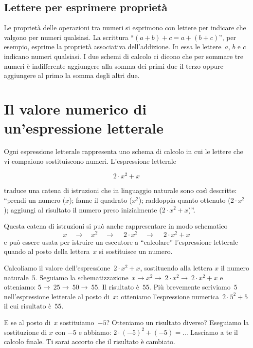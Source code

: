 \subsection{Lettere per esprimere proprietà}

Le proprietà delle operazioni tra numeri si esprimono con lettere per indicare che valgono per numeri
qualsiasi.
La scrittura ``$(a+b)+c=a+(b+c)$'', per esempio, esprime la proprietà associativa dell'addizione. In essa le lettere~$a$, $b$ e $c$ indicano
numeri qualsiasi. I due schemi di calcolo ci dicono che per sommare tre numeri è indifferente aggiungere alla somma
dei primi due il terzo oppure aggiungere al primo la somma degli altri due.

\vspazio\ovalbox{\risolvii \ref{ese:8.5}, \ref{ese:8.6}, \ref{ese:8.7}, \ref{ese:8.8}, \ref{ese:8.9}, \ref{ese:8.10}, \ref{ese:8.11}, \ref{ese:8.12}}

\section{Il valore numerico di un'espressione letterale}

Ogni espressione letterale rappresenta uno schema di calcolo in cui le lettere che vi compaiono sostituiscono numeri.
L'espressione letterale

\[2\cdot x^{2}+x\]

\noindent traduce una catena di istruzioni che in linguaggio naturale sono così
descritte: ``prendi un numero ($x$); fanne il quadrato ($x^2$); raddoppia quanto ottenuto ($2\cdot x^2$); aggiungi al risultato il numero preso inizialmente ($2\cdot x^{2}+x$)''.

Questa catena di istruzioni si può anche rappresentare in modo schematico
\[x\quad\rightarrow\quad x^{2}\quad\rightarrow\quad~2\cdot x^{2}\quad\rightarrow\quad~2\cdot x^{2}+x\]
e può essere usata per istruire un esecutore a ``calcolare'' l'espressione letterale
quando al posto della lettera~$x$ si sostituisce un numero.

Calcoliamo il valore dell'espressione~$2\cdot x^{2}+x$, sostituendo alla lettera $x$ il numero naturale~5.
Seguiamo la schematizzazione~$x\rightarrow x^{2}\rightarrow~2\cdot x^{2}\rightarrow~2\cdot x^{2}+x$ e otteniamo:
$5\rightarrow~25\rightarrow~50\rightarrow~55$.
Il risultato è~$55$.
Più brevemente scriviamo~$5$ nell'espressione letterale al posto di~$x$: otteniamo l'espressione numerica~$2\cdot 5^{2}+5$
il cui risultato è~$55$.

E se al posto di~$x$ sostituiamo~$-5$? Otteniamo un risultato diverso? Eseguiamo la sostituzione di $x$ con $-5$ e abbiamo: $2\cdot (-5)^{2}+(-5)=\ldots$ Lasciamo a te il calcolo finale. Ti sarai accorto che il
risultato è cambiato.

